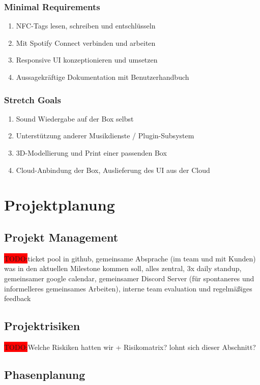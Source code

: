 \documentclass[10pt, a4paper, draft]{article}
\begin{document}
\subsubsection{Minimal Requirements}
\begin{enumerate}
  \item NFC-Tags lesen, schreiben und entschlüsseln
  \item Mit Spotify Connect verbinden und arbeiten
  \item Responsive UI konzeptionieren und umsetzen
  \item Aussagekräftige Dokumentation mit Benutzerhandbuch
\end{enumerate}
\subsubsection{Stretch Goals}
\begin{enumerate}
  \item Sound Wiedergabe auf der Box selbst
  \item Unterstützung anderer Musikdienste / Plugin-Subsystem
  \item 3D-Modellierung und Print einer passenden Box
  \item Cloud-Anbindung der Box, Auslieferung des UI aus der Cloud
\end{enumerate}

\section{Projektplanung}

\subsection{Projekt Management}
\colorbox{red}{TODO:}ticket pool in github, gemeinsame Absprache (im team und mit Kunden) was in den aktuellen Milestone kommen soll, alles zentral, 3x daily standup, gemeinsamer google calendar, gemeinsamer Discord Server (für spontaneres und informelleres gemeinsames Arbeiten), interne team evaluation und regelmäßiges feedback

\subsection{Projektrisiken}
\colorbox{red}{TODO:}Welche Riskiken hatten wir + Risikomatrix? lohnt sich dieser Abschnitt?

\subsection{Phasenplanung}
\end{document}
